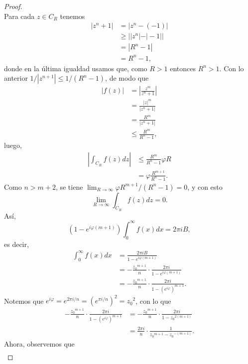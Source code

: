 \begin{proof}
$$   $$
   Para cada $z\in C_R$ tenemos
   $$
   \begin{aligned}
      |z^n+1|&=|z^n-(-1)|\\
             &\geq||z^n|-|-1||\\
             &=|R^n-1|\\
             &=R^n-1,
   \end{aligned}
   $$
   donde en la última igualdad usamos que, como $R>1$ entonces $R^n>1$. Con lo anterior $1/|z^{n+1}|\leq 1/(R^n-1)$, de modo que
   $$
   \begin{aligned}
      |f(z)|&=\left|\frac{z^m}{z^n+1}\right|\\
            &=\frac{|z|^m}{|z^n+1|}\\
            &=\frac{R^m}{|z^n+1|}\\
            &\leq\frac{R^m}{R^n-1},
   \end{aligned}
   $$
   luego,
   $$
   \begin{aligned}
      \left|\int_{C_R}f(z)dz\right|&\leq \frac{R^m}{R^n-1}\varphi R\\
                                   &=\varphi \frac{R^{m+1}}{R^n-1}.
   \end{aligned}
   $$
   Como $n>m+2$, se tiene $\lim_{R\to\infty} \varphi R^{m+1}/(R^n-1)=0$, y con esto
   $$
   \lim_{R\to\infty}\int_{C_R}f(z)dz=0.
   $$
   Así,
   $$
   \left( 1-e^{i\varphi(m+1)}\right)\int_{0}^{\infty}f(x)dx=2\pi i B,
   $$
   es decir,
   $$
   \begin{aligned}
      \int_{0}^{\infty}f(x)dx&=\frac{2\pi i B}{1-e^{i\varphi(m+1)}}\\
                             &=-\frac{{z_0}^{m+1}}{n}\cdot\frac{2\pi i}{1-e^{i\varphi(m+1)}}\\
                             &=-\frac{{z_0}^{m+1}}{n}\cdot\frac{2\pi i}{1-\left( e^{i\varphi}\right)^{m+1}}.
   \end{aligned}
   $$
   Notemos que $e^{i\varphi}=e^{2\pi i/n}=\left( e^{\pi i/n}\right)^2={z_0}^2$, con lo que
   $$
   \begin{aligned}
      -\frac{{z_0}^{m+1}}{n}\cdot\frac{2\pi i}{1-\left( e^{i\varphi}\right)^{m+1}}&=-\frac{{z_0}^{m+1}}{n}\cdot\frac{2\pi i}{1-{z_0}^{2(m+1)}}\\
                                                                                  &=\frac{2\pi i}{n}\cdot\frac{1}{{z_0}^{m+1}-{z_0}^{-(m+1)}}.
   \end{aligned}
   $$
   Ahora, observemos que
   $$
   \begin{aligned}

\end{aligned}$$
\end{proof}
